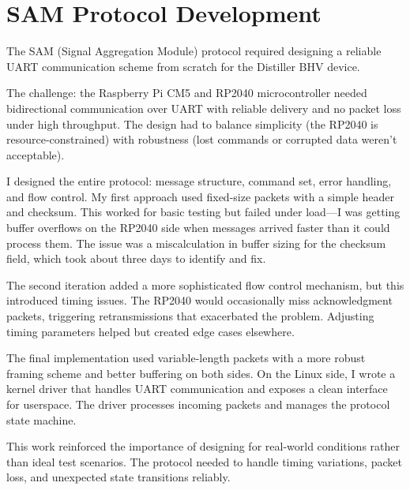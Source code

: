 \documentclass[12pt,a4paper]{report}
\begin{document}
\section{SAM Protocol Development}

The SAM (Signal Aggregation Module) protocol required designing a reliable UART communication scheme from scratch for the Distiller BHV device.

\vspace{0.3cm}

The challenge: the Raspberry Pi CM5 and RP2040 microcontroller needed bidirectional communication over UART with reliable delivery and no packet loss under high throughput. The design had to balance simplicity (the RP2040 is resource-constrained) with robustness (lost commands or corrupted data weren't acceptable).

\vspace{0.3cm}

I designed the entire protocol: message structure, command set, error handling, and flow control. My first approach used fixed-size packets with a simple header and checksum. This worked for basic testing but failed under load—I was getting buffer overflows on the RP2040 side when messages arrived faster than it could process them. The issue was a miscalculation in buffer sizing for the checksum field, which took about three days to identify and fix.

\vspace{0.3cm}

The second iteration added a more sophisticated flow control mechanism, but this introduced timing issues. The RP2040 would occasionally miss acknowledgment packets, triggering retransmissions that exacerbated the problem. Adjusting timing parameters helped but created edge cases elsewhere.

\vspace{0.3cm}

The final implementation used variable-length packets with a more robust framing scheme and better buffering on both sides. On the Linux side, I wrote a kernel driver that handles UART communication and exposes a clean interface for userspace. The driver processes incoming packets and manages the protocol state machine.

\vspace{0.3cm}

This work reinforced the importance of designing for real-world conditions rather than ideal test scenarios. The protocol needed to handle timing variations, packet loss, and unexpected state transitions reliably.
\end{document}
